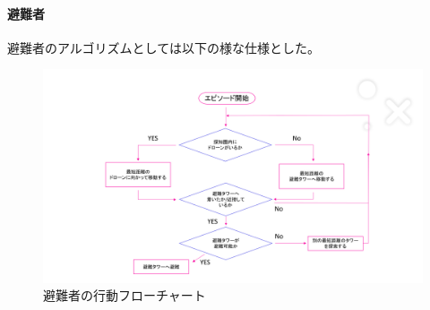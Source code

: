 \paragraph{避難者}
避難者のアルゴリズムとしては以下の様な仕様とした。
\begin{figure}[H]
    \centering
    \includegraphics[scale=0.8]{./images/334170449-c22ed682-06c1-4fbc-ba4b-07d946d8a047.png}
    \caption{
       避難者の行動フローチャート
    }
\end{figure}